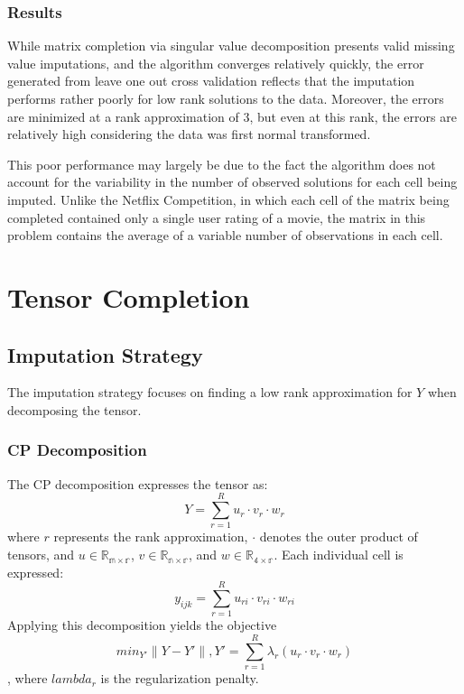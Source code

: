 \documentclass[12pt,twoside]{dukestatscithesis}
\theoremstyle{definition}
\theoremstyle{definition}
\theoremstyle{definition}
\theoremstyle{remark}
\begin{document}
\subsection{Results}\label{results}

While matrix completion via singular value decomposition presents valid
missing value imputations, and the algorithm converges relatively
quickly, the error generated from leave one out cross validation
reflects that the imputation performs rather poorly for low rank
solutions to the data. Moreover, the errors are minimized at a rank
approximation of 3, but even at this rank, the errors are relatively
high considering the data was first normal transformed.

This poor performance may largely be due to the fact the algorithm does
not account for the variability in the number of observed solutions for
each cell being imputed. Unlike the Netflix Competition, in which each
cell of the matrix being completed contained only a single user rating
of a movie, the matrix in this problem contains the average of a
variable number of observations in each cell.

\chapter{Tensor Completion}\label{tensor-completion}

\section{Imputation Strategy}\label{imputation-strategy}

The imputation strategy focuses on finding a low rank approximation for
\(Y\) when decomposing the tensor.

\subsection{CP Decomposition}\label{cp-decomposition}

The CP decomposition expresses the tensor as:
\[Y = \sum_{r=1}^Ru_r \cdotp v_r \cdotp w_r\] where \(r\) represents the
rank approximation, \(\cdotp\) denotes the outer product of tensors, and
\(u \in \mathbb{R_{m \times r}}\), \(v \in \mathbb{R_{n \times r}}\),
and \(w \in \mathbb{R_{4 \times r}}\). Each individual cell is
expressed: \[y_{ijk} = \sum_{r=1}^Ru_{ri} \cdotp v_{ri} \cdotp w_{ri}\]
Applying this decomposition yields the objective
\[min_{Y'}\|Y-Y'\|, Y' = \sum_{r=1}^R\lambda_r(u_r \cdotp v_r \cdotp w_r)\],
where \(lambda_r\) is the regularization penalty.
\end{document}
